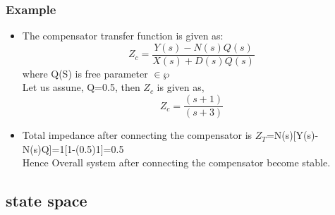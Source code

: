 \documentclass{beamer}
\begin{document}
\begin{frame}
\frametitle{Example}
\begin{small}

        \begin{itemize}
\item The compensator transfer function is given as:
\begin{equation}
Z_c =\frac{Y(s)-N(s)Q(s)}{X(s)+D(s)Q(s)}
\end{equation}
where Q(S) is free parameter $\in \wp$\\
Let us assune, Q=0.5, then $Z_c$ is given as,
\begin{equation}
Z_c =\frac{(s+1)}{(s+3)}
\end{equation}
\item Total impedance after connecting the compensator is $Z_T$=N(s)[Y(s)-N(s)Q]=1[1-(0.5)1]=0.5\\
Hence Overall system after connecting the compensator become stable.

\end{itemize}
\end{small}

\end{frame}






\subsection*{state space}
\end{document}
